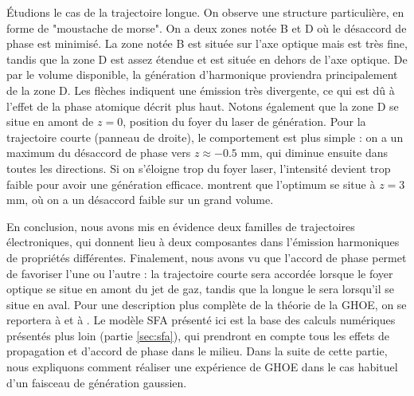 \'Etudions le cas de la trajectoire longue. On observe une structure particulière, en forme de "moustache de morse". On a deux zones notée B et D où le désaccord de phase est minimisé. La zone notée B est située sur l'axe optique mais est très fine, tandis que la zone D est assez étendue et est située en dehors de l'axe optique. De par le volume disponible, la génération d'harmonique proviendra principalement de la zone D. Les flèches indiquent une émission très divergente, ce qui est dû à l'effet de la phase atomique décrit plus haut. Notons également que la zone D se situe en amont de $z=0$, position du foyer du laser de génération. Pour la trajectoire courte (panneau de droite), le comportement est plus simple : on a un maximum du désaccord de phase vers $z\approx-0.5$ mm, qui diminue ensuite dans toutes les directions. Si on s'éloigne trop du foyer laser, l'intensité devient trop faible pour avoir une génération efficace.  montrent que l'optimum se situe à $z=3$ mm, où on a un désaccord faible sur un grand volume. 

En conclusion, nous avons mis en évidence deux familles de trajectoires électroniques, qui donnent lieu à deux composantes dans l'émission harmoniques de propriétés différentes. Finalement, nous avons vu que l'accord de phase permet de favoriser l'une ou l'autre : la trajectoire courte sera accordée lorsque le foyer optique se situe en amont du jet de gaz, tandis que la longue le sera lorsqu'il se situe en aval. Pour une description plus complète de la théorie de la GHOE, on se reportera à  et à . Le modèle SFA présenté ici est la base des calculs numériques présentés plus loin (partie \ref{sec:sfa}), qui prendront en compte tous les effets de propagation et d'accord de phase dans le milieu. Dans la suite de cette partie, nous expliquons comment réaliser une expérience de GHOE dans le cas habituel d'un faisceau de génération gaussien.

